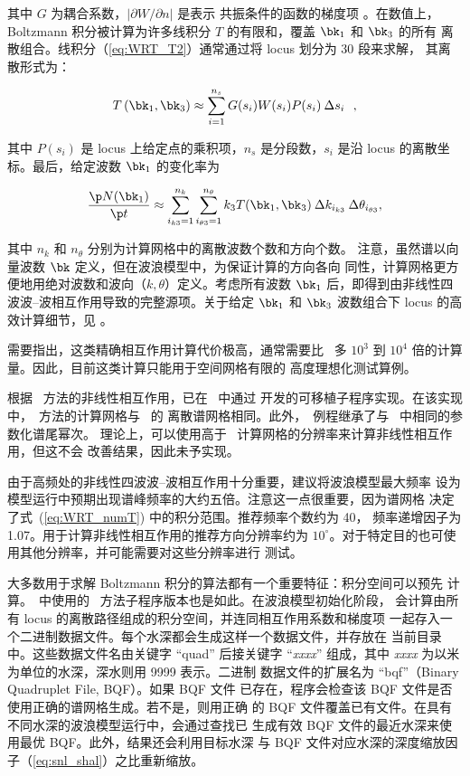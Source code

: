 \noindent
其中 $G$ 为耦合系数，$\left| {\partial W/\partial n}\right|$ 是表示
共振条件的函数的梯度项 \citep[见][]{pro:vVl00}。在数值上，Boltzmann
积分被计算为许多线积分 $T$ 的有限和，覆盖 $\bk_1$ 和 $\bk_3$ 的所有
离散组合。线积分（\ref{eq:WRT_T2}）通常通过将 locus 划分为 30 段来求解，
其离散形式为：

\begin{equation}
T\left( {\bk_1 ,\bk_3 } \right) \approx \sum_{i=1}^{n_s } G(s_i)
W(s_i) P(s_i) \: \Delta s_i \:\:\: ,
\end{equation}

\noindent
其中 $P(s_i)$ 是 locus 上给定点的乘积项，$n_s$ 是分段数，$s_i$ 是沿
locus 的离散坐标。最后，给定波数 $\bk_1$ 的变化率为

\begin{equation}
\frac{\p N(\bk_1)}{\p t} \approx \sum_{i_{k3}  = 1}^{n_k }
{\sum_{i_{\theta 3}  = 1}^{n_\theta  } k_3 T(\bk_1,\bk_3) \: \Delta
k_{i_{k3}} \: \Delta \theta_{i_{\theta 3} } }, \label{eq:WRT_numT}
\end{equation}

\noindent
其中 $n_k$ 和 $n_\theta$ 分别为计算网格中的离散波数个数和方向个数。
注意，虽然谱以向量波数 $\bk$ 定义，但在波浪模型中，为保证计算的方向各向
同性，计算网格更方便地用绝对波数和波向（$k,\theta$）定义。考虑所有波数
$\bk_1$ 后，即得到由非线性四波波--波相互作用导致的完整源项。关于给定
$\bk_1$ 和 $\bk_3$ 波数组合下 locus 的高效计算细节，见
\cite{pro:vVl00,rep:vVl02a,rep:vVl02b}。

需要指出，这类精确相互作用计算代价极高，通常需要比 \dia\ 多
$10^3$ 到 $10^4$ 倍的计算量。因此，目前这类计算只能用于空间网格有限的
高度理想化测试算例。

根据 \xnl\ 方法的非线性相互作用，已在 \ws\ 中通过 \cite{rep:vVl02b}
开发的可移植子程序实现。在该实现中，\xnl\ 方法的计算网格与 \ws\ 的
离散谱网格相同。此外，\xnl\ 例程继承了与 \dia\ 中相同的参数化谱尾幂次。
理论上，可以使用高于 \ws\ 计算网格的分辨率来计算非线性相互作用，但这不会
改善结果，因此未予实现。

由于高频处的非线性四波波--波相互作用十分重要，建议将波浪模型最大频率
设为模型运行中预期出现谱峰频率的大约五倍。注意这一点很重要，因为谱网格
决定了式~(\ref{eq:WRT_numT}) 中的积分范围。推荐频率个数约为 40，
频率递增因子为 1.07。用于计算非线性相互作用的推荐方向分辨率约为
$10^\circ$。对于特定目的也可使用其他分辨率，并可能需要对这些分辨率进行
测试。

大多数用于求解 Boltzmann 积分的算法都有一个重要特征：积分空间可以预先
计算。\ws\ 中使用的 \xnl\ 方法子程序版本也是如此。在波浪模型初始化阶段，
会计算由所有 locus 的离散路径组成的积分空间，并连同相互作用系数和梯度项
一起存入一个二进制数据文件。每个水深都会生成这样一个数据文件，并存放在
当前目录中。这些数据文件名由关键字 “quad” 后接关键字 “{\it{xxxx}}”
组成，其中 {\it xxxx} 为以米为单位的水深，深水则用 9999 表示。二进制
数据文件的扩展名为 “bqf”（Binary Quadruplet File, BQF）。如果 BQF 文件
已存在，程序会检查该 BQF 文件是否使用正确的谱网格生成。若不是，则用正确
的 BQF 文件覆盖已有文件。在具有不同水深的波浪模型运行中，会通过查找已
生成有效 BQF 文件的最近水深来使用最优 BQF。此外，结果还会利用目标水深
与 BQF 文件对应水深的深度缩放因子（\ref{eq:snl_shal}）之比重新缩放。
